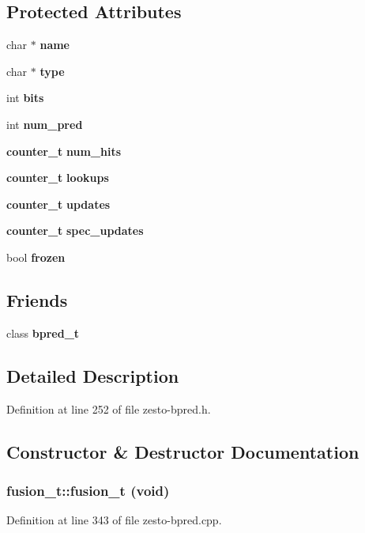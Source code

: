 \subsection*{Protected Attributes}
\begin{CompactItemize}
\item 
char $\ast$ {\bf name}
\item 
char $\ast$ {\bf type}
\item 
int {\bf bits}
\item 
int {\bf num\_\-pred}
\item 
{\bf counter\_\-t} {\bf num\_\-hits}
\item 
{\bf counter\_\-t} {\bf lookups}
\item 
{\bf counter\_\-t} {\bf updates}
\item 
{\bf counter\_\-t} {\bf spec\_\-updates}
\item 
bool {\bf frozen}
\end{CompactItemize}
\subsection*{Friends}
\begin{CompactItemize}
\item 
class {\bf bpred\_\-t}
\end{CompactItemize}


\subsection{Detailed Description}


Definition at line 252 of file zesto-bpred.h.

\subsection{Constructor \& Destructor Documentation}
\subsubsection[{fusion\_\-t}]{\setlength{\rightskip}{0pt plus 5cm}fusion\_\-t::fusion\_\-t (void)}\label{classfusion__t_0bb39051ad152e546033b564a608cada}




Definition at line 343 of file zesto-bpred.cpp.
